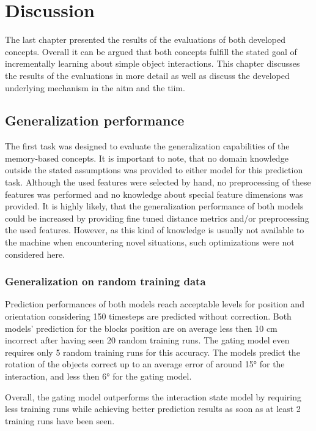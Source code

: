 \chapter{Discussion \label{chap:discussion}}

The last chapter presented the results of the evaluations of both developed concepts. Overall it can be argued that both concepts fulfill the stated goal of incrementally learning about simple object interactions. This chapter discusses the results of the evaluations in more detail as well as discuss the developed underlying mechanism in the \gls{aitm} and the \gls{tiim}.

\section{Generalization performance}

The first task was designed to evaluate the generalization capabilities of the memory-based concepts. It is important to note, that no domain knowledge outside the stated assumptions was provided to either model for this prediction task. Although the used features were selected by hand, no preprocessing of these features was performed and no knowledge about special feature dimensions was provided. It is highly likely, that the generalization performance of both models could be increased by providing fine tuned distance metrics and/or preprocessing the used features.
However, as this kind of knowledge is usually not available to the machine when encountering novel situations, such optimizations were not considered here.

\subsection{Generalization on random training data}

Prediction performances of both models reach acceptable levels for position and orientation considering 150 timesteps are predicted without correction. 
Both models' prediction for the blocks position are on average less then 10 cm incorrect after having seen 20 random training runs. The gating model even requires only 5 random training runs for this accuracy. 
The models predict the rotation of the objects correct up to an average error of around 15° for the interaction, and less then 6° for the gating model.

Overall, the gating model outperforms the interaction state model by requiring less training runs while achieving better prediction results as soon as at least 2 training runs have been seen.

